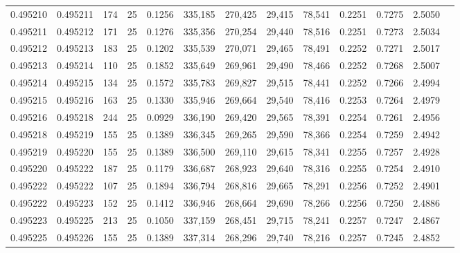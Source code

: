 \begin{tabular}{rrrrrrrrrrrrr}
0.495210 & 0.495211 &   174 &  25 &                                     0.1256 & 335,185 & 270,425 &  29,415 &  78,541 & 0.2251 & 0.7275 & 2.5050 \\
0.495211 & 0.495212 &   171 &  25 &                                     0.1276 & 335,356 & 270,254 &  29,440 &  78,516 & 0.2251 & 0.7273 & 2.5034 \\
0.495212 & 0.495213 &   183 &  25 &                                     0.1202 & 335,539 & 270,071 &  29,465 &  78,491 & 0.2252 & 0.7271 & 2.5017 \\
0.495213 & 0.495214 &   110 &  25 &                                     0.1852 & 335,649 & 269,961 &  29,490 &  78,466 & 0.2252 & 0.7268 & 2.5007 \\
0.495214 & 0.495215 &   134 &  25 &                                     0.1572 & 335,783 & 269,827 &  29,515 &  78,441 & 0.2252 & 0.7266 & 2.4994 \\
0.495215 & 0.495216 &   163 &  25 &                                     0.1330 & 335,946 & 269,664 &  29,540 &  78,416 & 0.2253 & 0.7264 & 2.4979 \\
0.495216 & 0.495218 &   244 &  25 &                                     0.0929 & 336,190 & 269,420 &  29,565 &  78,391 & 0.2254 & 0.7261 & 2.4956 \\
0.495218 & 0.495219 &   155 &  25 &                                     0.1389 & 336,345 & 269,265 &  29,590 &  78,366 & 0.2254 & 0.7259 & 2.4942 \\
0.495219 & 0.495220 &   155 &  25 &                                     0.1389 & 336,500 & 269,110 &  29,615 &  78,341 & 0.2255 & 0.7257 & 2.4928 \\
0.495220 & 0.495222 &   187 &  25 &                                     0.1179 & 336,687 & 268,923 &  29,640 &  78,316 & 0.2255 & 0.7254 & 2.4910 \\
0.495222 & 0.495222 &   107 &  25 &                                     0.1894 & 336,794 & 268,816 &  29,665 &  78,291 & 0.2256 & 0.7252 & 2.4901 \\
0.495222 & 0.495223 &   152 &  25 &                                     0.1412 & 336,946 & 268,664 &  29,690 &  78,266 & 0.2256 & 0.7250 & 2.4886 \\
0.495223 & 0.495225 &   213 &  25 &                                     0.1050 & 337,159 & 268,451 &  29,715 &  78,241 & 0.2257 & 0.7247 & 2.4867 \\
0.495225 & 0.495226 &   155 &  25 &                                     0.1389 & 337,314 & 268,296 &  29,740 &  78,216 & 0.2257 & 0.7245 & 2.4852 \\

\end{tabular}
